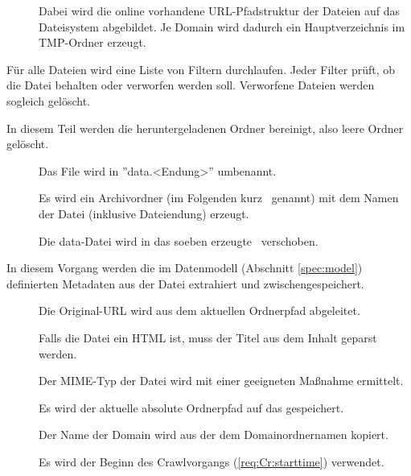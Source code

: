 \begin{description}
\begin{description}
			\item []
				Dabei wird die online vorhandene URL-Pfadstruktur der Dateien 
				auf das Dateisystem abgebildet.
				Je Domain wird dadurch ein Hauptverzeichnis im TMP-Ordner erzeugt.
		\end{description}
	\item [\req{Filterung}{filter}]
		Für alle Dateien wird eine Liste von Filtern durchlaufen.
		Jeder Filter prüft, ob die Datei behalten oder verworfen werden soll.
		Verworfene Dateien werden sogleich gelöscht.
	\item [\req{Bereinigung}{clean}]
		In diesem Teil werden die heruntergeladenen Ordner bereinigt,
		also leere Ordner gelöscht.
	\item [\req{Normalisierung}{normalize}]
		\begin{description}
			\item []
				Das File wird in ''data.<Endung>'' umbenannt. 
			\item [] 
				Es wird ein Archivordner (im Folgenden kurz \arc\ genannt) 
				mit dem Namen der Datei (inklusive Dateiendung) 
				erzeugt.
			\item []
				Die data-Datei wird in das soeben erzeugte \arc\ verschoben.
		\end{description}
	\item [\req{Extraktion der Metadaten}{metaextract}]
		In diesem Vorgang werden die im Datenmodell (Abschnitt \ref{spec:model}) 
		definierten Metadaten 
		aus der Datei extrahiert und zwischengespeichert. 
		\begin{description}
			\item []
				Die Original-URL wird aus dem aktuellen Ordnerpfad abgeleitet.
			\item []
				Falls die Datei ein HTML ist, 
				muss der Titel aus dem Inhalt geparst werden.
			\item []
				Der MIME-Typ der Datei wird mit einer geeigneten Maßnahme ermittelt.
			\item []
				Es wird der aktuelle absolute Ordnerpfad auf das \arc gespeichert.
			\item []
				Der Name der Domain wird aus der dem Domainordnernamen kopiert.
			\item []
				Es wird der Beginn des Crawlvorgangs (\ref{req:Cr:starttime}) verwendet. 

\end{description}
\end{description}
